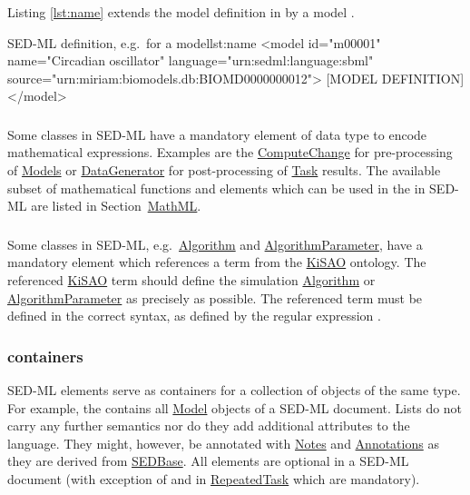 Listing \ref{lst:name} extends the model definition in  by a model .

\begin{myXmlLst}{SED-ML  definition, e.g.\ for a model}{lst:name}
<model id="m00001" name="Circadian oscillator" language="urn:sedml:language:sbml" source="urn:miriam:biomodels.db:BIOMD0000000012">
	[MODEL DEFINITION]
</model>
\end{myXmlLst}


\subsubsection{}
\label{sec:math}
Some classes in SED-ML have a mandatory element  of data type \hyperref[type:mathml]{} to encode mathematical expressions. Examples are the \hyperref[class:computeChange]{ComputeChange} for pre-processing of \hyperref[class:model]{Models} or \hyperref[class:dataGenerator]{DataGenerator} for post-processing of \hyperref[class:task]{Task} results.
The available subset of mathematical functions and elements which can be used in the  in SED-ML are listed in Section~\hyperref[sec:mathML]{MathML}.

\subsubsection{}
\label{sec:kisaoid}
Some classes in SED-ML, e.g.\ \hyperref[class:algorithm]{Algorithm} and \hyperref[class:algorithmParameter]{AlgorithmParameter}, have a mandatory element  which references a term from the \hyperref[sec:kisao]{KiSAO} ontology. The referenced \hyperref[sec:kisao]{KiSAO} term  should define the simulation \hyperref[class:algorithm]{Algorithm} or \hyperref[class:algorithmParameter]{AlgorithmParameter} as precisely as possible. The referenced term must be defined in the correct syntax, as defined by the regular expression .


\subsubsection{ containers}
\label{sec:listOf}
SED-ML  elements serve as containers for a collection of objects of the same type. For example, the \hyperref[sec:listOfModels]{} contains all \hyperref[class:model]{Model} objects of a SED-ML document. Lists do not carry any further semantics nor do they add additional attributes to the language. They might, however, be annotated with \hyperref[class:notes]{Notes} and \hyperref[class:annotation]{Annotations} as they are derived from \hyperref[class:sedBase]{SEDBase}. All  elements are optional in a SED-ML document (with exception of \hyperref[sec:listOfRanges]{} and \hyperref[class:subTask]{} in \hyperref[class:repeatedTask]{RepeatedTask} which are mandatory).


